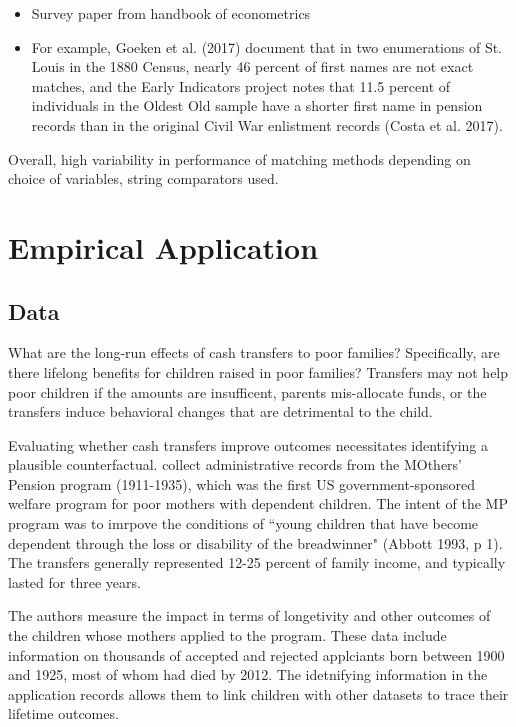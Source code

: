 \documentclass[12pt]{article}
\begin{document}
\begin{itemize}
\item Survey paper from handbook of econometrics
\item For example, Goeken et al. (2017) document that
in two enumerations of St. Louis in the 1880 Census, nearly 46 percent of first names are not exact matches,
and the Early Indicators project notes that 11.5 percent of individuals in the Oldest Old sample have a
shorter first name in pension records than in the original Civil War enlistment records (Costa et al. 2017). 
\end{itemize}

Overall, high variability in performance of matching methods depending on choice of variables, string comparators used. 


\section{Empirical Application}



\subsection{Data}

What are the long-run effects of cash transfers to poor families?  Specifically, are there lifelong benefits for children raised in poor families?  Transfers may not help poor children if the amounts are insufficent, parents mis-allocate funds, or the transfers induce behavioral changes that are detrimental to the child.  

Evaluating whether cash transfers improve outcomes necessitates identifying a plausible counterfactual.  \cite{aizer2019}  collect administrative records from the MOthers' Pension program (1911-1935), which was the first US government-sponsored welfare program for poor mothers with dependent children.  The intent of the MP program was to imrpove the conditions of ``young children that have become dependent through the loss or disability of the breadwinner" (Abbott 1993, p 1).  The transfers generally represented 12-25 percent of family income, and typically lasted for three years.   

The authors measure the impact in terms of longetivity and other outcomes of the children whose mothers applied to the program.  These data include information on thousands of accepted and rejected applciants born between 1900 and 1925, most of whom had died by 2012.  The idetnifying information in the application records allows them to link children with other datasets to trace their lifetime outcomes.
\end{document}
